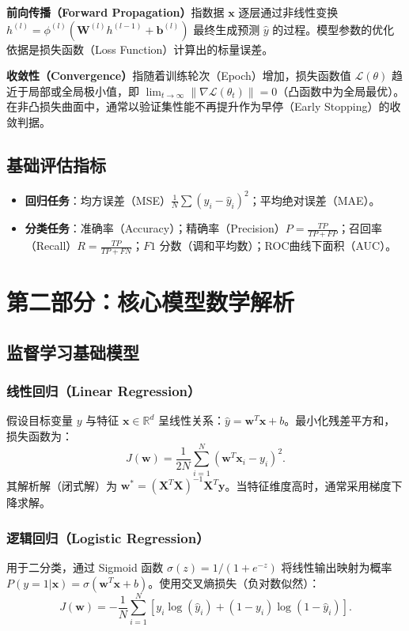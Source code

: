 \documentclass[12pt,a4paper]{ctexart}
\begin{document}
\textbf{前向传播（Forward Propagation）}指数据 $\mathbf{x}$ 逐层通过非线性变换 $h^{(l)} = \phi^{(l)}(\mathbf{W}^{(l)} h^{(l-1)} + \mathbf{b}^{(l)})$ 最终生成预测 $\hat{y}$ 的过程。模型参数的优化依据是损失函数（Loss Function）计算出的标量误差。

\textbf{收敛性（Convergence）}指随着训练轮次（Epoch）增加，损失函数值 $\mathcal{L}(\theta)$ 趋近于局部或全局极小值，即 $\lim_{t \to \infty} \|\nabla \mathcal{L}(\theta_t)\| = 0$（凸函数中为全局最优）。在非凸损失曲面中，通常以验证集性能不再提升作为早停（Early Stopping）的收敛判据。

\subsection{基础评估指标}
\begin{itemize}
    \item \textbf{回归任务}：均方误差（MSE）$\frac{1}{N}\sum(y_i - \hat{y}_i)^2$；平均绝对误差（MAE）。
    \item \textbf{分类任务}：准确率（Accuracy）；精确率（Precision）$P = \frac{TP}{TP+FP}$；召回率（Recall）$R = \frac{TP}{TP+FN}$；$F1$ 分数（调和平均数）；ROC曲线下面积（AUC）。
\end{itemize}

\section{第二部分：核心模型数学解析}
\label{sec:models}

\subsection{监督学习基础模型}

\subsubsection{线性回归（Linear Regression）}
假设目标变量 $y$ 与特征 $\mathbf{x} \in \mathbb{R}^d$ 呈线性关系：$\hat{y} = \mathbf{w}^T \mathbf{x} + b$。最小化残差平方和，损失函数为：
\begin{equation}
    J(\mathbf{w}) = \frac{1}{2N}\sum_{i=1}^N (\mathbf{w}^T \mathbf{x}_i - y_i)^2.
\end{equation}
其解析解（闭式解）为 $\mathbf{w}^* = (\mathbf{X}^T \mathbf{X})^{-1}\mathbf{X}^T \mathbf{y}$。当特征维度高时，通常采用梯度下降求解。

\subsubsection{逻辑回归（Logistic Regression）}
用于二分类，通过 Sigmoid 函数 $\sigma(z) = 1/(1+e^{-z})$ 将线性输出映射为概率 $P(y=1|\mathbf{x}) = \sigma(\mathbf{w}^T \mathbf{x} + b)$。使用交叉熵损失（负对数似然）：
\begin{equation}
    J(\mathbf{w}) = -\frac{1}{N}\sum_{i=1}^N \left[ y_i \log(\hat{y}_i) + (1-y_i)\log(1-\hat{y}_i) \right].
\end{equation}
\end{document}
